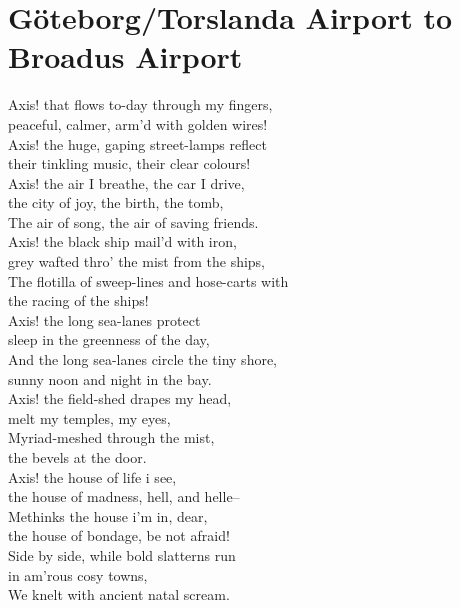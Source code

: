 \documentclass[smalldemyvopaper,11pt,twoside,onecolumn,openright,extrafontsizes]{memoir}
\begin{document}
\chapter{Göteborg/Torslanda Airport to Broadus Airport}
Axis! that flows to-day through my fingers,
\\peaceful, calmer, arm'd with golden wires!
\\Axis! the huge, gaping street-lamps reflect
\\their tinkling music, their clear colours!
\\Axis! the air I breathe, the car I drive,
\\the city of joy, the birth, the tomb,
\\The air of song, the air of saving friends.
\\Axis! the black ship mail'd with iron,
\\grey wafted thro' the mist from the ships,
\\The flotilla of sweep-lines and hose-carts with
\\the racing of the ships!
\\Axis! the long sea-lanes protect
\\sleep in the greenness of the day,
\\And the long sea-lanes circle the tiny shore,
\\sunny noon and night in the bay.
\\Axis! the field-shed drapes my head,
\\melt my temples, my eyes,
\\Myriad-meshed through the mist,
\\the bevels at the door.
\\Axis! the house of life i see,
\\the house of madness, hell, and helle--
\\Methinks the house i'm in, dear,
\\the house of bondage, be not afraid!
\\Side by side, while bold slatterns run
\\in am'rous cosy towns,
\\We knelt with ancient natal scream.
\end{document}
